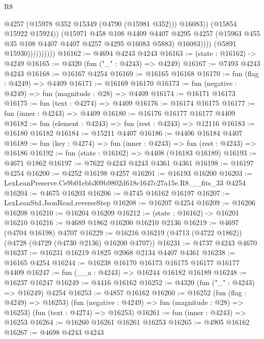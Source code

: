 \begin{lexlean}{R8}
\begin{coremodule}
                                  @4257
                                  (@15978 @352 @15349 (@4790 (@15981 @352)))
                                  @16083))
                              (@15854 @15922 @15924))
                            (@15971
                              @458
                              @108
                              @4409
                              @4407
                              @4295
                              @4257
                              (@15963 @455 @35 @108 @4407 @4407 @4257 @4295 @16083 @5883)
                              @16083))))
                      (@5891 @15930))))))))))
@16162 := @4694 @4243 @4243
@16163 := (state : @16162) -> @4249
@16165 := @4320 (fun ("_" : @4243) => @4249)
@16167 := @7493 @4243 @4243
@16168 := @16167 @4254
@16169 := @16165 @16168
@16170 := fun (flag : @4249) => @4409
@16171 := @16169 @16170
@16173 := fun (negative : @4249) => fun (magnitude : @28) => @4409
@16174 := @16171 @16173
@16175 := fun (text : @4274) => @4409
@16176 := @16174 @16175
@16177 := fun (inner : @4243) => @4409
@16180 := @16176 @16177 @16177 @4409
@16182 := fun (element : @4243) => fun (rest : @4243) => @12116
@16183 := @16180 @16182
@16184 := @15211 @4407
@16186 := @4406 @16184 @4407
@16189 := fun (key : @4274) => fun (inner : @4243) => fun (rest : @4243) => @16186
@16192 := fun (state : @16162) => @4408 (@16183 @16189)
@16193 := @4671 @1862
@16197 := @7622 @4243 @4243 @4361 @4361
@16198 := @16197 @4254
@16200 := @4252 @16198 @4257
@16201 := @16193 @16200
@16203 := LexLeanPreserve.Ce9b01ebb309b9802d618c1647c27a15e.R8.__fits_33 @4254
@16204 := @4675 @16203
@16206 := @4745 @16162 @16197
@16207 := LexLeanStd.JsonRead.reverseStep
@16208 := @16207 @4254
@16209 := @16206 @16208
@16210 := @16204 @16209
@16212 := (state : @16162) -> @16201 @16210
@16216 := @4689 @1862 @16200 @16210 @2136
@16219 := @4697 (@4704 @16198) @4707
@16229 := @16216 @16219 (@4713 (@4722 @1862)) (@4728 (@4729 (@4730 @2136) @16200 @4707))
@16231 := @4737 @4243 @4670
@16237 := @16231 @16219 @1825 @2068 @2134 @4407 @4361
@16238 := @16165 @4254
@16244 := @16238 @16170 @16173 @16175 @16177 @16177 @4409
@16247 := fun (__a : @4243) => @16244 @16182 @16189
@16248 := @16237 @16247
@16249 := @4416 @16162
@16252 := @4320 (fun ("_" : @4243) => @16249) @4254
@16253 := @4857 @16162
@16260 := @16252
    (fun (flag : @4249) => @16253)
    (fun (negative : @4249) => fun (magnitude : @28) => @16253)
    (fun (text : @4274) => @16253)
@16261 := fun (inner : @4243) => @16253
@16264 := @16260 @16261 @16261 @16253
@16265 := @4905 @16162
@16267 := @4698 @4243 @4243

\end{coremodule}
\end{lexlean}
